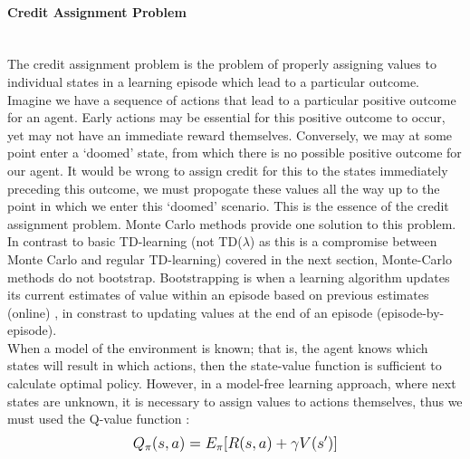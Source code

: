 \documentclass[12pt]{article}
\begin{document}
\paragraph{Credit Assignment Problem}~\\
The credit assignment problem \autocite{watkins1989learning,sutton1984temporal} is the problem of properly assigning values to individual states in a learning episode which lead to a particular outcome. Imagine we have a sequence of actions that lead to a particular positive outcome for an agent. Early actions may be essential for this positive outcome to occur, yet may not have an immediate reward themselves. Conversely, we may at some point enter a `doomed' state, from which there is no possible positive outcome for our agent. It would be wrong to assign credit for this to the states immediately preceding this outcome, we must propogate these values all the way up to the point in which we enter this `doomed' scenario. This is the essence of the credit assignment problem. Monte Carlo methods provide one solution to this problem.\\\newline
In contrast to  basic TD-learning (not TD($\lambda$) as this is a compromise between Monte Carlo and regular TD-learning) covered in the next section, Monte-Carlo methods do not bootstrap. Bootstrapping is when a learning algorithm updates its current estimates of value within an episode based on previous estimates (online) \autocite{rlintrochap6}, in constrast to updating values at the end of an episode (episode-by-episode). \\\newline
When a model of the environment is known; that is, the agent knows which states will result in which actions, then the state-value function is sufficient to calculate optimal policy. However, in a model-free learning approach, where next states are unknown, it is necessary to assign values to actions themselves, thus we must used the Q-value function \autocite{watkins1992q}:
\begin{equation}
    \mathlarger{
        Q_{\pi}(s,a) = E_\pi[R(s,a) + \gamma V(s')]
    }
\end{equation}
\end{document}
